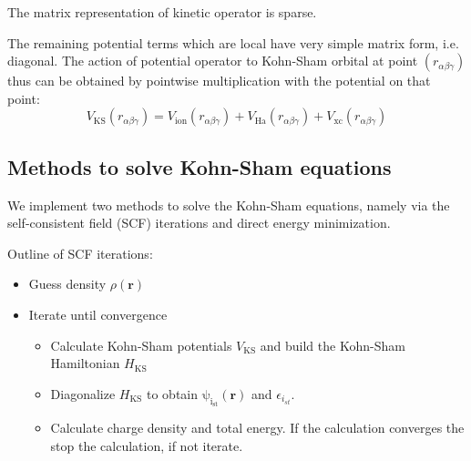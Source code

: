 The matrix representation of kinetic operator is sparse.

The remaining potential terms which are local have very simple matrix form, i.e.
diagonal. The action of potential operator to Kohn-Sham orbital at point
$(r_{\alpha\beta\gamma})$ thus can be
obtained by pointwise multiplication with the potential on that point:
\begin{equation}
V_{\mathrm{KS}}(r_{\alpha\beta\gamma}) = V_{\mathrm{ion}}(r_{\alpha\beta\gamma}) +
V_{\mathrm{Ha}}(r_{\alpha\beta\gamma}) + V_{\mathrm{xc}}(r_{\alpha\beta\gamma})
\end{equation}

\subsection{Methods to solve Kohn-Sham equations}

We implement two methods to solve the Kohn-Sham equations, namely
via the self-consistent field (SCF) iterations and
direct energy minimization.

Outline of SCF iterations:
\begin{itemize}
\item Guess density $\rho(\mathbf{r})$
\item Iterate until convergence
\begin{itemize}
\item Calculate Kohn-Sham potentials $V_{\mathrm{KS}}$ and build the Kohn-Sham
Hamiltonian $H_{\mathrm{KS}}$
\item Diagonalize $H_{\mathrm{KS}}$ to obtain $\mathrm{\psi_{i_{st}}}(\mathbf{r})$
and $\epsilon_{i_{st}}$.
\item Calculate charge density and total energy. If the calculation converges
the stop the calculation, if not iterate.
\end{itemize}
\end{itemize}


